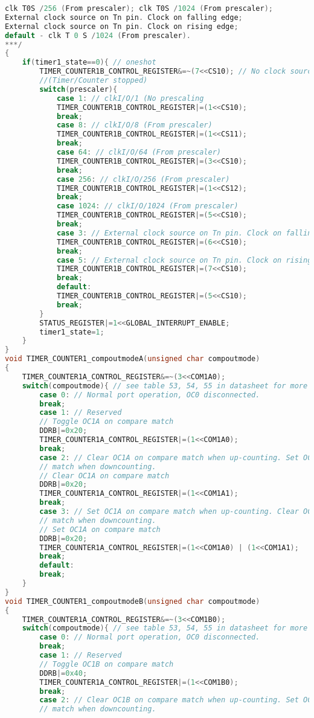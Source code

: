 \begin{lstlisting}[language=C]
clk T0S /256 (From prescaler); clk T0S /1024 (From prescaler);
External clock source on Tn pin. Clock on falling edge;
External clock source on Tn pin. Clock on rising edge;
default - clk T 0 S /1024 (From prescaler).
***/
{
	if(timer1_state==0){ // oneshot
		TIMER_COUNTER1B_CONTROL_REGISTER&=~(7<<CS10); // No clock source.
		//(Timer/Counter stopped)
		switch(prescaler){
			case 1: // clkI/O/1 (No prescaling
			TIMER_COUNTER1B_CONTROL_REGISTER|=(1<<CS10);
			break;
			case 8: // clkI/O/8 (From prescaler)
			TIMER_COUNTER1B_CONTROL_REGISTER|=(1<<CS11);
			break;
			case 64: // clkI/O/64 (From prescaler)
			TIMER_COUNTER1B_CONTROL_REGISTER|=(3<<CS10);
			break;
			case 256: // clkI/O/256 (From prescaler)
			TIMER_COUNTER1B_CONTROL_REGISTER|=(1<<CS12);
			break;
			case 1024: // clkI/O/1024 (From prescaler)
			TIMER_COUNTER1B_CONTROL_REGISTER|=(5<<CS10);
			break;
			case 3: // External clock source on Tn pin. Clock on falling edge
			TIMER_COUNTER1B_CONTROL_REGISTER|=(6<<CS10);
			break;
			case 5: // External clock source on Tn pin. Clock on rising edge
			TIMER_COUNTER1B_CONTROL_REGISTER|=(7<<CS10);
			break;
			default:
			TIMER_COUNTER1B_CONTROL_REGISTER|=(5<<CS10);
			break;
		}
		STATUS_REGISTER|=1<<GLOBAL_INTERRUPT_ENABLE;
		timer1_state=1;
	}	
}
void TIMER_COUNTER1_compoutmodeA(unsigned char compoutmode)
{
	TIMER_COUNTER1A_CONTROL_REGISTER&=~(3<<COM1A0);
	switch(compoutmode){ // see table 53, 54, 55 in datasheet for more information
		case 0: // Normal port operation, OC0 disconnected.
		break;
		case 1: // Reserved
		// Toggle OC1A on compare match
		DDRB|=0x20;
		TIMER_COUNTER1A_CONTROL_REGISTER|=(1<<COM1A0);
		break;
		case 2: // Clear OC1A on compare match when up-counting. Set OC0 on compare
		// match when downcounting.
		// Clear OC1A on compare match
		DDRB|=0x20;
		TIMER_COUNTER1A_CONTROL_REGISTER|=(1<<COM1A1);
		break;
		case 3: // Set OC1A on compare match when up-counting. Clear OC0 on compare
		// match when downcounting.
		// Set OC1A on compare match
		DDRB|=0x20;
		TIMER_COUNTER1A_CONTROL_REGISTER|=(1<<COM1A0) | (1<<COM1A1);
		break;
		default:
		break;
	}
}
void TIMER_COUNTER1_compoutmodeB(unsigned char compoutmode)
{
	TIMER_COUNTER1A_CONTROL_REGISTER&=~(3<<COM1B0);
	switch(compoutmode){ // see table 53, 54, 55 in datasheet for more information
		case 0: // Normal port operation, OC0 disconnected.
		break;
		case 1: // Reserved
		// Toggle OC1B on compare match
		DDRB|=0x40;
		TIMER_COUNTER1A_CONTROL_REGISTER|=(1<<COM1B0);
		break;
		case 2: // Clear OC1B on compare match when up-counting. Set OC0 on compare
		// match when downcounting.

\end{lstlisting}
